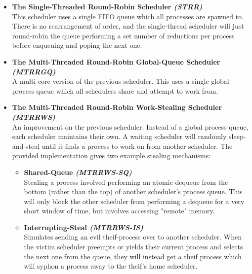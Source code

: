 \begin{itemize}
    \item {\bf The Single-Threaded Round-Robin Scheduler {\sl (STRR)}} \\
        This scheduler uses a single FIFO queue which all processes are spawned 
        to. There is no rearrangement of order, and the single-thread scheduler 
        will just round-robin the queue performing a set number of reductions
        per process before enqueuing and poping the next one.

    \item {\bf The Multi-Threaded Round-Robin Global-Queue Scheduler {\sl (MTRRGQ)}} \\
        A multi-core version of the previous scheduler. This uses a single global
        process queue which all schedulers share and attempt to work from.

    \item {\bf The Multi-Threaded Round-Robin Work-Stealing Scheduler {\sl (MTRRWS)}} \\
        An improvement on the previous scheduler. Instead of a global process 
        queue, each scheduler maintains their own. A waiting scheduler will randomly 
        sleep-and-steal until it finds a process to work on from another scheduler. 
        The provided implementation gives two example stealing mechanisms:
        \begin{itemize}
            \item {\bf Shared-Queue {\sl (MTRRWS-SQ)}} \\
                Stealing a process involved performing an atomic dequeue from 
                the bottom (rather than the top) of another scheduler's process 
                queue. This will only block the other scheduler from performing
                a dequeue for a very short window of time, but involves 
                accessing "remote" memory.
            \item {\bf Interrupting-Steal {\sl (MTRRWS-IS)}} \\
                Simulates sending an evil theif-process over to another scheduler.
                When the victim scheduler preempts or yields their current process
                and selects the next one from the queue, they will instead get a
                theif process which will syphon a process away to the theif's home
                scheduler.
        \end{itemize}
\end{itemize}

